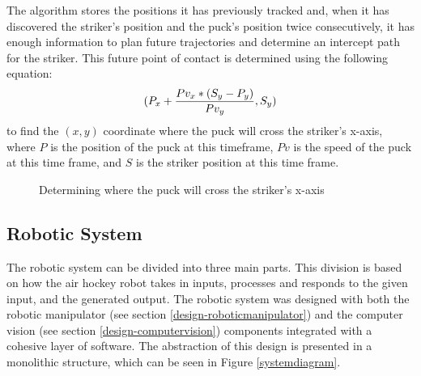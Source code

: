 \documentclass[letterpaper, 12 pt, conference]{ieeeconf}
\begin{document}
The algorithm stores the positions it has previously tracked and, when it has discovered the striker’s position and the puck’s position twice consecutively, it has enough information to plan future trajectories and determine an intercept path for the striker. This future point of contact is determined using the following equation:
\begin{equation}
(P_{x} + {{P v_{x} * (S_{y} - P_{y})}\over{P v_{y}}}, S_{y})
\end{equation}
to find the $(x, y)$ coordinate where the puck will cross the striker’s x-axis, where $P$ is the position of the puck at this timeframe, $Pv$ is the speed of the puck at this time frame, and $S$ is the striker position at this time frame. 



\begin{figure}[!h]
\centering
{}
\caption{Determining where the puck will cross the striker’s x-axis}
\end{figure}


\subsection{Robotic System}
\label{design-roboticsystem}
The robotic system can be divided into three main parts. This division is based on how the air hockey robot takes in inputs, processes and responds to the given input, and the generated output. The robotic system was designed with both the robotic manipulator (see section \ref{design-roboticmanipulator}) and the computer vision (see section \ref{design-computervision}) components integrated with a cohesive layer of software. The abstraction of this design is presented in a monolithic structure, which can be seen in Figure \ref{systemdiagram}.  
\end{document}
